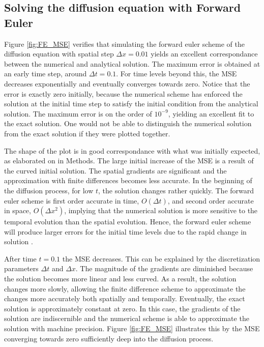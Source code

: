 \documentclass[12pt]{extarticle}
\begin{document}
\subsection{Solving the diffusion equation with Forward Euler}
Figure \ref{fig:FE_MSE} verifies that simulating the forward euler scheme of the diffusion equation with spatial step $\Delta x = 0.01$ yields an excellent correspondance between the numerical and analytical solution. The maximum error is obtained at an early time step, around $\Delta t = 0.1$. For time levels beyond this, the MSE decreases exponentially and eventually converges towards zero. Notice that the error is exactly zero initially, because the numerical scheme has enforced the solution at the initial time step to satisfy the initial condition from the analytical solution. The maximum error is on the order of $10^{-9}$, yielding an excellent fit to the exact solution. One would not be able to distinguish the numerical solution from the exact solution if they were plotted together.

\par The shape of the plot is in good correspondance with what was initially expected, as elaborated on in Methods. The large initial increase of the MSE is a result of the curved initial solution. The spatial gradients are significant and the approximation with finite differences becomes less accurate.
In the beginning of the diffusion process, for low $t$, the solution changes rather quickly. The forward euler scheme is first order accurate in time, $O(\Delta t)$, and second order accurate in space, $O(\Delta x^2)$, implying that the numerical solution is more sensitive to the temporal evolution than the spatial evolution. Hence, the forward euler scheme will produce larger errors for the initial time levels due to the rapid change in solution \cite{Linge2017}.
\par After time $t=0.1$ the MSE decreases. This can be explained by the discretization parameters $\Delta t$ and $\Delta x$. The magnitude of the gradients are diminished because the solution becomes more linear and less curved. As a result, the solution changes more slowly, allowing the finite difference scheme to approximate the changes more accurately both spatially and temporally. Eventually, the exact solution is approximately constant at zero. In this case, the gradients of the solution are indiscernible and the numerical scheme is able to approximate the solution with machine precision. Figure \ref{fig:FE_MSE} illustrates this by the MSE converging towards zero sufficiently deep into the diffusion process.
\end{document}
